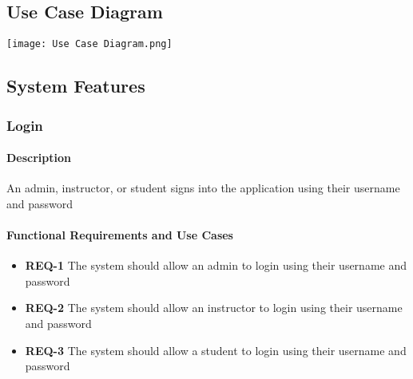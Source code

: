 \documentclass{article}
\begin{document}
\newpage

\subsection{Use Case Diagram}

\texttt{[image: Use Case Diagram.png]}

\newpage

\subsection{System Features}

\subsubsection{Login}

\paragraph{Description} An admin, instructor, or student signs into the application using their username and password

\paragraph{Functional Requirements and Use Cases}

\begin{itemize}
  \item \textbf{REQ-1} The system should allow an admin to login using their username and password
  \item \textbf{REQ-2} The system should allow an instructor to login using their username and password
  \item \textbf{REQ-3} The system should allow a student to login using their username and password
\end{itemize}


\vspace{0.1in}
\end{document}
